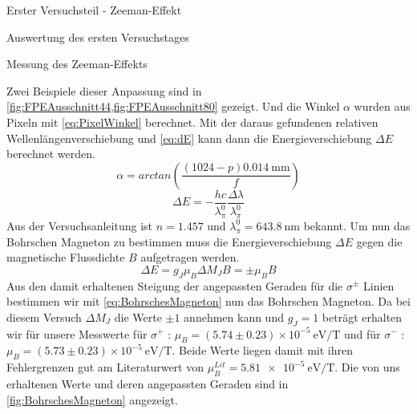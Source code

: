 \documentclass[pdftex, a4paper,11pt, twoside, ngerman]{report}
\begin{document}
\begin{chapter}{Erster Versuchsteil - Zeeman-Effekt}
\begin{section}{Auswertung des ersten Versuchstages}
\begin{subsection}{Messung des Zeeman-Effekts}
\begin{figure}[ht]
\begin{minipage}{0.48\textwidth}
          \end{minipage}
        \end{figure}
        Zwei Beispiele dieser Anpassung sind in
        \cref{fig:FPEAusschnitt44,fig:FPEAusschnitt80} gezeigt. Und die Winkel
        $\alpha$ wurden aus Pixeln mit \cref{eq:PixelWinkel} berechnet. Mit der
        daraus gefundenen relativen Wellenlängenverschiebung und \cref{eq:dE}
        kann dann die Energieverschiebung $\Delta E$ berechnet werden.
        \begin{equation}
          \label{eq:PixelWinkel}
          \alpha=arctan\left(\frac{(1024-p)\SI{0.014}{\milli\meter}}{f}\right)
        \end{equation}
        \begin{equation}
          \label{eq:dE}
          \Delta E = -\frac{hc}{\lambda_{\pi}^{0}}
          \frac{\Delta\lambda}{\lambda_{\pi}^{0}}
        \end{equation}
        Aus der Versuchsanleitung ist $n=1.457$ und
        $\lambda_{\pi}^{0}=\SI{643.8}{\nano\meter}$ bekannt. Um nun das
        Bohrschen Magneton zu bestimmen muss die Energieverschiebung $\Delta E$
        gegen die magnetische Flussdichte $B$ aufgetragen werden. 
        \begin{equation}
          \label{eq:BohrschesMagneton}
          \Delta E = g_{J}\mu_{B}\Delta M_{J}B = \pm\mu_{B}B
        \end{equation}
        Aus den damit erhaltenen Steigung der angepassten Geraden für die
        $\sigma^{\pm}$ Linien bestimmen wir mit \cref{eq:BohrschesMagneton} nun
        das Bohrschen Magneton. Da bei diesem Versuch $\Delta M_{J}$ die Werte
        $\pm1$ annehmen kann und $g_{J}=1$ beträgt erhalten wir für unsere
        Messwerte für $\sigma^{+}$ : $\mu_{B}=(5.74\pm0.23) \times10^{-5}
        \SI{}{\electronvolt\per\tesla}$ und für $\sigma^{-}$ : $\mu_{B}=
        (5.73\pm0.23) \times10^{-5}\SI{}{\electronvolt\per\tesla}$.
        Beide Werte liegen damit mit ihren Fehlergrenzen gut am Literaturwert
        von $\mu_{B}^{Lit}=\SI{5.81e-5}{\electronvolt\per\tesla}$.
        Die von uns erhaltenen Werte und deren angepassten Geraden sind in
        \cref{fig:BohrschesMagneton} angezeigt.
        \begin{figure}[ht]
          \centering

\end{figure}
\end{subsection}
\end{section}
\end{chapter}
\end{document}
